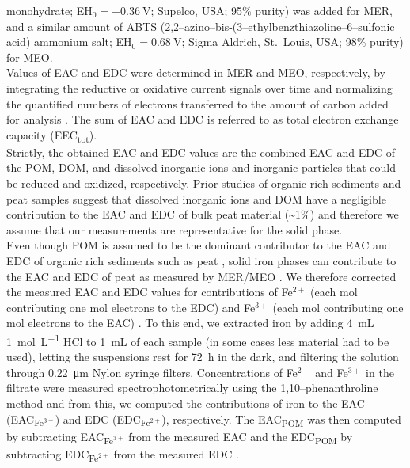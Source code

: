 \documentclass[draft,linenumbers]{agujournal2018}
\begin{document}
monohydrate; EH\(_0=\SI{-0.36}{\V}\); Supelco, USA; 95\% purity) was
added for MER, and a similar amount of ABTS
(2,2--azino--bis-(3--ethylbenzthiazoline--6--sulfonic acid) ammonium
salt; EH\(_0=\SI{+0.68}{\V}\); Sigma Aldrich, St.~Louis, USA; 98\%
purity) for MEO.\\
Values of EAC and EDC were determined in MER and MEO, respectively, by
integrating the reductive or oxidative current signals over time and
normalizing the quantified numbers of electrons transferred to the
amount of carbon added for analysis \citep{Aeschbacher.2010}. The sum of
EAC and EDC is referred to as total electron exchange capacity
(EEC\textsubscript{tot}).\\
Strictly, the obtained EAC and EDC values are the combined EAC and EDC
of the POM, DOM, and dissolved inorganic ions and inorganic particles
that could be reduced and oxidized, respectively. Prior studies of
organic rich sediments and peat samples suggest that dissolved inorganic
ions and DOM have a negligible contribution to the EAC and EDC of bulk
peat material (\textasciitilde1\%) \citep{Lau.2015, Gao.2019} and
therefore we assume that our measurements are representative for the
solid phase.\\
Even though POM is assumed to be the dominant contributor to the EAC and
EDC of organic rich sediments such as peat \citep{Lau.2015, Gao.2019},
solid iron phases can contribute to the EAC and EDC of peat as measured
by MER/MEO \citep{Lau.2015}. We therefore corrected the measured EAC and
EDC values for contributions of Fe\(^{2+}\) (each mol contributing one
mol electrons to the EDC) and Fe\(^{3+}\) (each mol contributing one mol
electrons to the EAC) \citep{Lau.2015, Gao.2019}. To this end, we
extracted iron by adding \SI{4}{\milli\liter} \SI{1}{\mol\per\L} HCl to
\SI{1}{\milli\liter} of each sample (in some cases less material had to
be used), letting the suspensions rest for \SI{72}{\hour} in the dark,
and filtering the solution through \SI{0.22}{\micro\meter} Nylon syringe
filters. Concentrations of Fe\(^{2+}\) and Fe\(^{3+}\) in the filtrate
were measured spectrophotometrically using the 1,10--phenanthroline
method \citep{Tamura.1974} and from this, we computed the contributions
of iron to the EAC (EAC\textsubscript{Fe$^{3+}$}) and EDC
(EDC\textsubscript{Fe$^{2+}$}), respectively. The EAC\textsubscript{POM}
was then computed by subtracting EAC\textsubscript{Fe$^{3+}$} from the
measured EAC and the EDC\textsubscript{POM} by subtracting
EDC\textsubscript{Fe$^{2+}$} from the measured EDC \citep{Lau.2015}.\\
\end{document}
